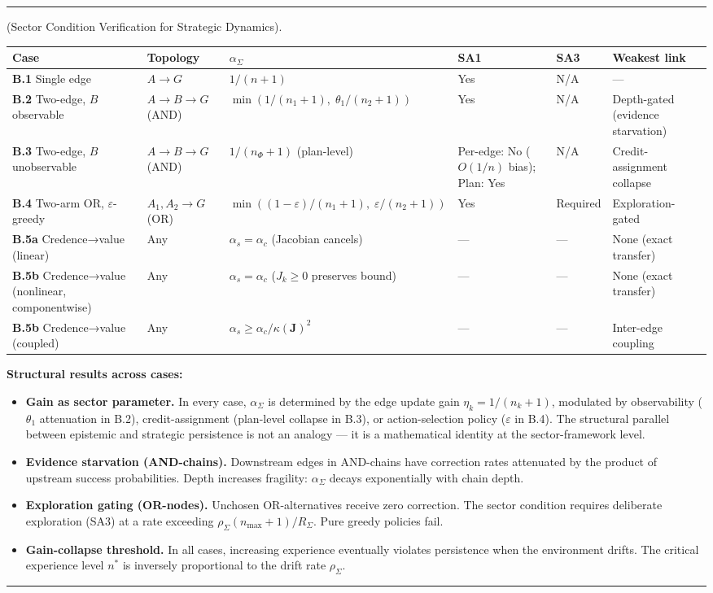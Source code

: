 \documentclass[11pt,oneside]{article}
\newcounter{claim}[section]
\renewcommand{\theclaim}{\thesection.\arabic{claim}}
\newenvironment{segment}[2]{%
  \refstepcounter{claim}%
  \bigskip\noindent\hrule\smallskip
  \noindent{\bfseries #1~\theclaim}\enskip(#2).\par\smallskip
  \noindent\ignorespaces
}{%
  \par\smallskip\noindent\hrule\bigskip
}
\newenvironment{derivation}[1][]{\begin{segment}{Derivation}{#1}}{\end{segment}}
\begin{document}
\begin{derivation}[Sector Condition Verification for Strategic Dynamics]
\begin{adjustbox}{max width=\textwidth}
\small
\begin{tabular}{llllll}
\toprule
Case & Topology & $\alpha_\Sigma$ & SA1 & SA3 & Weakest link \\
\midrule
\textbf{B.1} Single edge & $A \to G$ & $1/(n+1)$ & Yes & N/A & --- \\
\textbf{B.2} Two-edge, $B$ observable & $A \to B \to G$ (AND) & $\min(1/(n_1\!+\!1),\;\theta_1/(n_2\!+\!1))$ & Yes & N/A & Depth-gated (evidence starvation) \\
\textbf{B.3} Two-edge, $B$ unobservable & $A \to B \to G$ (AND) & $1/(n_\Phi\!+\!1)$ (plan-level) & Per-edge: No ($O(1/n)$ bias); Plan: Yes & N/A & Credit-assignment collapse \\
\textbf{B.4} Two-arm OR, $\varepsilon$-greedy & $A_1, A_2 \to G$ (OR) & $\min((1\!-\!\varepsilon)/(n_1\!+\!1),\;\varepsilon/(n_2\!+\!1))$ & Yes & Required & Exploration-gated \\
\textbf{B.5a} Credence→value (linear) & Any & $\alpha_s = \alpha_c$ (Jacobian cancels) & — & — & None (exact transfer) \\
\textbf{B.5b} Credence→value (nonlinear, componentwise) & Any & $\alpha_s = \alpha_c$ ($J_k \geq 0$ preserves bound) & — & — & None (exact transfer) \\
\textbf{B.5b} Credence→value (coupled) & Any & $\alpha_s \geq \alpha_c / \kappa(\mathbf{J})^2$ & — & — & Inter-edge coupling \\
\bottomrule
\end{tabular}
\end{adjustbox}


\textbf{Structural results across cases:}

\begin{itemize}
  \item \textbf{Gain as sector parameter.} In every case, $\alpha_\Sigma$ is determined by the edge update gain $\eta_k = 1/(n_k+1)$, modulated by observability ($\theta_1$ attenuation in B.2), credit-assignment (plan-level collapse in B.3), or action-selection policy ($\varepsilon$ in B.4). The structural parallel between epistemic and strategic persistence is not an analogy --- it is a mathematical identity at the sector-framework level.
  \item \textbf{Evidence starvation (AND-chains).} Downstream edges in AND-chains have correction rates attenuated by the product of upstream success probabilities. Depth increases fragility: $\alpha_\Sigma$ decays exponentially with chain depth.
  \item \textbf{Exploration gating (OR-nodes).} Unchosen OR-alternatives receive zero correction. The sector condition requires deliberate exploration (SA3) at a rate exceeding $\rho_\Sigma(n_{\max}+1)/R_\Sigma$. Pure greedy policies fail.
  \item \textbf{Gain-collapse threshold.} In all cases, increasing experience eventually violates persistence when the environment drifts. The critical experience level $n^*$ is inversely proportional to the drift rate $\rho_\Sigma$.
\end{itemize}





\end{derivation}
\end{document}
